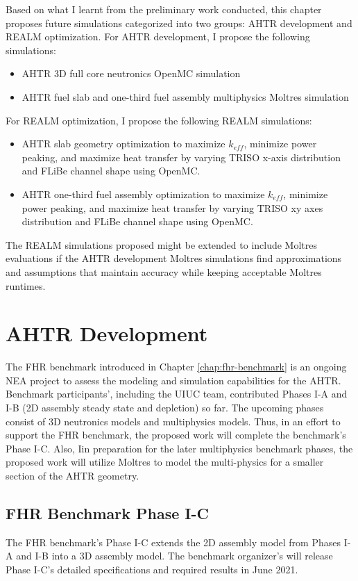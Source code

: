 Based on what I learnt from the preliminary work conducted, this chapter proposes 
future simulations categorized into two groups: \gls{AHTR} development and 
\gls{REALM} optimization. 
For \gls{AHTR} development, I propose the following simulations: 
\begin{itemize}
    \item \gls{AHTR} 3D full core neutronics OpenMC simulation
    \item \gls{AHTR} fuel slab and one-third fuel assembly multiphysics 
    Moltres simulation
\end{itemize}
For \gls{REALM} optimization, I propose the following \gls{REALM} simulations: 
\begin{itemize}
    \item \gls{AHTR} slab geometry optimization to maximize $k_{eff}$, 
    minimize power peaking, and maximize heat transfer by varying \gls{TRISO} 
    x-axis distribution and \gls{FLiBe} channel shape using OpenMC. 
    \item \gls{AHTR} one-third fuel assembly optimization to maximize $k_{eff}$, 
    minimize power peaking, and maximize heat transfer by varying \gls{TRISO} 
    xy axes distribution and \gls{FLiBe} channel shape using OpenMC.
\end{itemize}
The \gls{REALM} simulations proposed might be extended to include Moltres 
evaluations if the \gls{AHTR} development Moltres simulations find approximations 
and assumptions that maintain accuracy while keeping acceptable Moltres runtimes.

\section{AHTR Development}
The \gls{FHR} benchmark introduced in Chapter \ref{chap:fhr-benchmark} is an 
ongoing \gls{NEA} project to assess the modeling and simulation capabilities 
for the \gls{AHTR}. 
Benchmark participants', including the \gls{UIUC} team, contributed Phases I-A 
and I-B (2D assembly steady state and depletion) so far.  
The upcoming phases consist of 3D neutronics models and multiphysics models. 
Thus, in an effort to support the \gls{FHR} benchmark, the proposed work will 
complete the benchmark's Phase I-C.
Also, Iin preparation for the later multiphysics benchmark phases, the proposed 
work will utilize Moltres to model the multi-physics for a smaller section of 
the \gls{AHTR} geometry. 

\subsection{\gls{FHR} Benchmark Phase I-C}
The \gls{FHR} benchmark's Phase I-C extends the 2D assembly model from Phases 
I-A and I-B into a 3D assembly model. 
The benchmark organizer's will release Phase I-C's detailed specifications and 
required results in June 2021.

